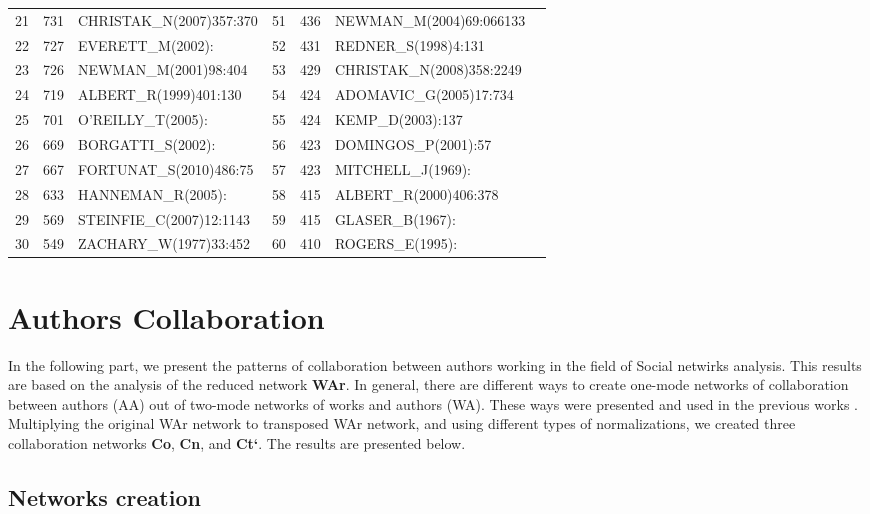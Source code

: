 \documentclass[11pt]{article} %
\begin{document}
\begin{table}
\begin{tabular}{c|c|l||c|c|l|l}
21&   	731&   	CHRISTAK\_N(2007)357:370&   	51&   	436&   	NEWMAN\_M(2004)69:066133\\
22&   	727&   	EVERETT\_M(2002):&   	52&   	431&   	REDNER\_S(1998)4:131\\
23&   	726&   	NEWMAN\_M(2001)98:404&   	53&   	429&   	CHRISTAK\_N(2008)358:2249\\
24&   	719&   	ALBERT\_R(1999)401:130&   	54&   	424&   	ADOMAVIC\_G(2005)17:734\\
25&   	701&   	O'REILLY\_T(2005):&   	55&   	424&   	KEMP\_D(2003):137\\
26&   	669&   	BORGATTI\_S(2002):&   	56&   	423&   	DOMINGOS\_P(2001):57\\
27&   	667&   	FORTUNAT\_S(2010)486:75&   	57&   	423&   	MITCHELL\_J(1969):\\
28&   	633&   	HANNEMAN\_R(2005):&   	58&   	415&   	ALBERT\_R(2000)406:378\\
29&   	569&   	STEINFIE\_C(2007)12:1143&   	59&   	415&   	GLASER\_B(1967):\\
30&   	549&   	ZACHARY\_W(1977)33:452&   	60&   	410&   	ROGERS\_E(1995):\\ \hline
\end{tabular}
\end{table}

\section{Authors Collaboration}  

In the following part, we present the patterns of collaboration between authors working in the field of Social netwirks analysis. This results are based on the analysis of the reduced network \textbf{WAr}. In general, there are different ways to create one-mode networks of collaboration between authors (AA) out of two-mode networks of works and authors (WA). These ways were presented and used in the previous works \citep{OnBibl,Understand}. Multiplying the original WAr network to transposed WAr network, and using different types of normalizations, we created three collaboration networks \textbf{Co}, \textbf{Cn}, and \textbf{Ct`}. The results are presented below. \medskip  

\subsection{Networks creation}  
\end{document}

